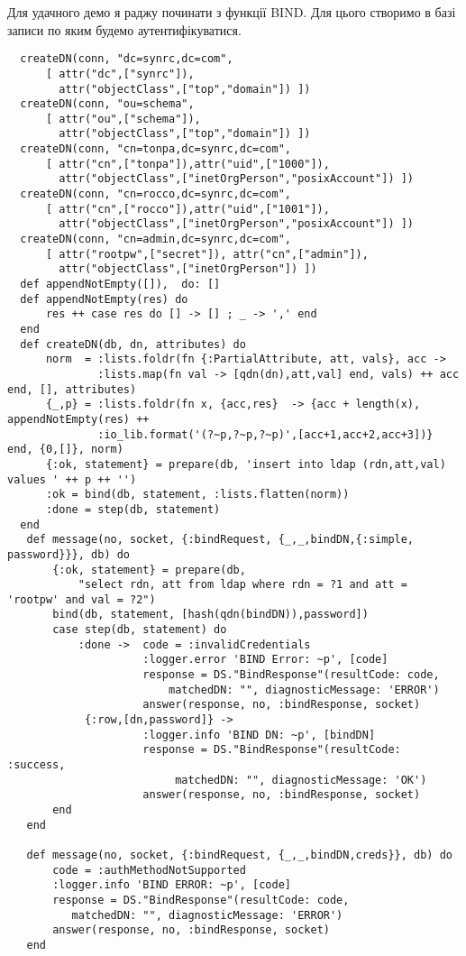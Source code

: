 Для удачного демо я раджу починати з функції BIND. Для цього створимо в базі записи по яким будемо аутентифікуватися.

\begin{lstlisting}
  createDN(conn, "dc=synrc,dc=com",
      [ attr("dc",["synrc"]),
        attr("objectClass",["top","domain"]) ])
  createDN(conn, "ou=schema",
      [ attr("ou",["schema"]),
        attr("objectClass",["top","domain"]) ])
  createDN(conn, "cn=tonpa,dc=synrc,dc=com",
      [ attr("cn",["tonpa"]),attr("uid",["1000"]),
        attr("objectClass",["inetOrgPerson","posixAccount"]) ])
  createDN(conn, "cn=rocco,dc=synrc,dc=com",
      [ attr("cn",["rocco"]),attr("uid",["1001"]),
        attr("objectClass",["inetOrgPerson","posixAccount"]) ])
  createDN(conn, "cn=admin,dc=synrc,dc=com",
      [ attr("rootpw",["secret"]), attr("cn",["admin"]),
        attr("objectClass",["inetOrgPerson"]) ])
  def appendNotEmpty([]),  do: []
  def appendNotEmpty(res) do
      res ++ case res do [] -> [] ; _ -> ',' end
  end
  def createDN(db, dn, attributes) do
      norm  = :lists.foldr(fn {:PartialAttribute, att, vals}, acc ->
              :lists.map(fn val -> [qdn(dn),att,val] end, vals) ++ acc end, [], attributes)
      {_,p} = :lists.foldr(fn x, {acc,res}  -> {acc + length(x), appendNotEmpty(res) ++
              :io_lib.format('(?~p,?~p,?~p)',[acc+1,acc+2,acc+3])} end, {0,[]}, norm)
      {:ok, statement} = prepare(db, 'insert into ldap (rdn,att,val) values ' ++ p ++ '')
      :ok = bind(db, statement, :lists.flatten(norm))
      :done = step(db, statement)
  end
   def message(no, socket, {:bindRequest, {_,_,bindDN,{:simple, password}}}, db) do
       {:ok, statement} = prepare(db,
           "select rdn, att from ldap where rdn = ?1 and att = 'rootpw' and val = ?2")
       bind(db, statement, [hash(qdn(bindDN)),password])
       case step(db, statement) do
           :done ->  code = :invalidCredentials
                     :logger.error 'BIND Error: ~p', [code]
                     response = DS."BindResponse"(resultCode: code,
                         matchedDN: "", diagnosticMessage: 'ERROR')
                     answer(response, no, :bindResponse, socket)
            {:row,[dn,password]} ->
                     :logger.info 'BIND DN: ~p', [bindDN]
                     response = DS."BindResponse"(resultCode: :success,
                          matchedDN: "", diagnosticMessage: 'OK')
                     answer(response, no, :bindResponse, socket)
       end
   end

   def message(no, socket, {:bindRequest, {_,_,bindDN,creds}}, db) do
       code = :authMethodNotSupported
       :logger.info 'BIND ERROR: ~p', [code]
       response = DS."BindResponse"(resultCode: code,
          matchedDN: "", diagnosticMessage: 'ERROR')
       answer(response, no, :bindResponse, socket)
   end
\end{lstlisting}

